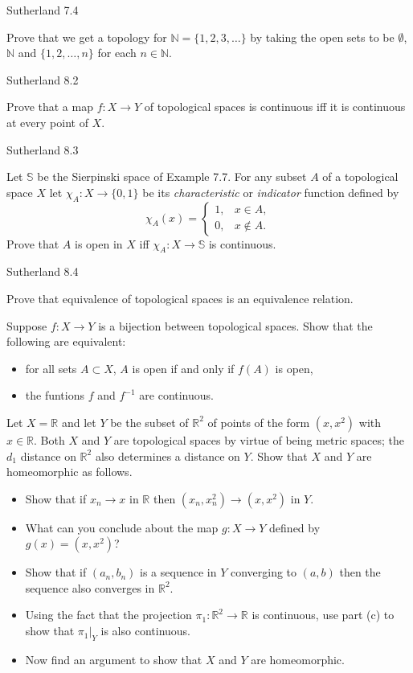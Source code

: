 \documentclass[minion]{homework}
\newcommand{\Reals}{\ensuremath{\mathbb R}}%
\newcommand{\Nats}{\ensuremath{\mathbb N}} %
\begin{document}
\begin{problems}

\problem Sutherland 7.4

Prove that we get a topology for $\Nats = \{1, 2, 3, \dots\}$ by taking the open sets to be $\emptyset$, $\Nats$ and $\{1, 2, \dots, n\}$ for each $n \in \Nats$.

\problem Sutherland 8.2

Prove that a map $f : X \to Y$ of topological spaces is continuous iff it is continuous at every point of $X$.

\problem Sutherland 8.3

Let $\mathbb{S}$ be the Sierpinski space of Example 7.7. For any subset $A$ of a topological space $X$ let $\chi_A : X \to \{0, 1\}$ be its \emph{characteristic} or \emph{indicator} function defined by
\[
\chi_A(x) =
\begin{cases}
1, & x \in A, \\
0, & x \notin A.
\end{cases}
\]
Prove that $A$ is open in $X$ iff $\chi_A : X \to \mathbb{S}$ is continuous.

\problem Sutherland 8.4

Prove that equivalence of topological spaces is an equivalence relation.

\problem Suppose $f:X\to Y$ is a bijection between topological spaces.
Show that the following are equivalent:
\begin{itemize}
\item for all sets $A\subset  X$, $A$ is open if and only if $f(A)$ is open,
\item the funtions $f$ and $f^{-1}$ are continuous.
\end{itemize}

\problem Let $X=\Reals$ and let $Y$ be the subset of $\Reals^2$ 
of points of the form $(x,x^2)$ with $x\in \Reals$. Both $X$ and $Y$
are topological spaces by virtue of being metric spaces; the $d_1$ 
distance on $\Reals^2$ also determines a distance on $Y$.
Show that $X$ and $Y$ are homeomorphic as follows.
\begin{itemize}
\item Show that if $x_n\to x$ in $\Reals$ then $(x_n, x_n^2)\to (x,x^2)$ in $Y$.
\item What can you conclude about the map $g:X\to Y$ defined by $g(x)=(x,x^2)$?
\item Show that if $(a_n,b_n)$ is a sequence in $Y$ converging to $(a,b)$
then the sequence also converges in $\Reals^2$.
\item Using the fact that the projection $\pi_1: \Reals^2 \to \Reals$ 
is continuous, use part (c) to show that $\pi_1|_Y$ is also continuous.
\item Now find an argument to show that $X$ and $Y$ are homeomorphic.
\end{itemize}


\end{problems}
\end{document}
